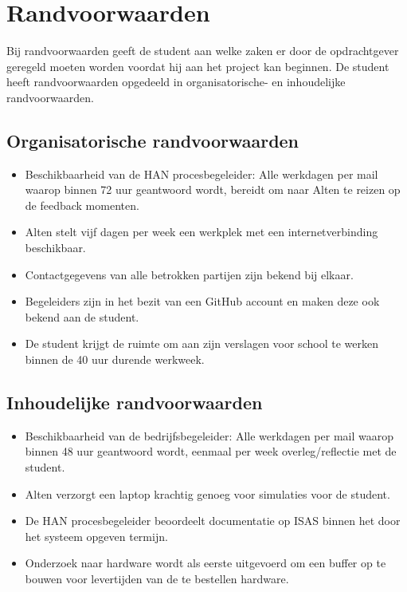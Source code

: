 \documentclass[a4paper, 11pt, oneside]{report}
\begin{document}
\chapter{Randvoorwaarden}
\label{chapter:randvoorwaarden}
Bij randvoorwaarden geeft de student aan welke zaken er door de opdrachtgever geregeld moeten worden voordat hij aan het project kan beginnen. De student heeft randvoorwaarden opgedeeld in organisatorische- en inhoudelijke randvoorwaarden. 

\section{Organisatorische randvoorwaarden}
\begin{itemize}
	\item Beschikbaarheid van de HAN procesbegeleider: Alle werkdagen per mail waarop binnen 72 uur geantwoord wordt, bereidt om naar Alten te reizen op de feedback momenten.
	\item Alten stelt vijf dagen per week een werkplek met een internetverbinding beschikbaar.
	\item Contactgegevens van alle betrokken partijen zijn bekend bij elkaar.
	\item Begeleiders zijn in het bezit van een GitHub account en maken deze ook bekend aan de student.
	\item De student krijgt de ruimte om aan zijn verslagen voor school te werken binnen de 40 uur durende werkweek.
	
\end{itemize}
\section{Inhoudelijke randvoorwaarden}
\begin{itemize}
	\item Beschikbaarheid van de bedrijfsbegeleider: Alle werkdagen per mail waarop binnen 48 uur geantwoord wordt, eenmaal per week overleg/reflectie met de student.
	\item Alten verzorgt een laptop krachtig genoeg voor simulaties voor de student.
	\item De HAN procesbegeleider beoordeelt documentatie op ISAS binnen het door het systeem opgeven termijn.
	\item Onderzoek naar hardware wordt als eerste uitgevoerd om een buffer op te bouwen voor levertijden van de te bestellen hardware.
	  
\end{itemize}
\end{document}
